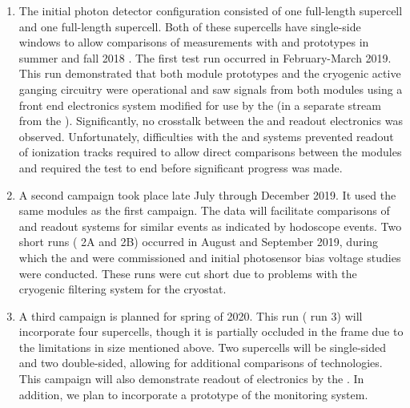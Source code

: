 \begin{enumerate}
    \item The initial photon detector configuration consisted of one full-length  supercell and one full-length  supercell.  Both of these supercells have single-side windows to allow comparisons of measurements with  and  prototypes in summer and fall 2018 .  
    The first test run occurred in February-March 2019. This run demonstrated that both module prototypes and the cryogenic active ganging circuitry were operational and saw signals from both modules using a  front end electronics system modified for use by the   (in a separate stream from the  ). Significantly, no crosstalk between the  and  readout electronics was observed.  Unfortunately, difficulties with the   and  systems prevented readout of ionization tracks required to allow direct comparisons between the  modules and required the test to end before significant progress was made.


    \item A second campaign took place late July through December 2019. It used the same  modules as the first campaign. 
    The data will facilitate comparisons of  and  readout systems for similar events as indicated by hodoscope events.  
    Two short runs ( 2A and 2B) occurred in August and September 2019, during which the  and  were commissioned and initial photosensor bias voltage studies were conducted.  These runs were cut short due to problems with the cryogenic filtering system for the  cryostat.

    \item A third campaign is planned for spring of 2020.  This run ( run 3) will incorporate four  supercells, though it is partially occluded in the frame due to the limitations in  size mentioned above.  Two supercells will be single-sided and two double-sided, allowing for additional comparisons of  technologies.  This campaign will also demonstrate readout of  electronics by the  .  In addition, we plan to incorporate a prototype of the   monitoring system.
    
\end{enumerate}

